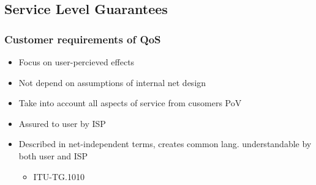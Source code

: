 \documentclass[a4paper]{article}
\begin{document}
\subsection{Service Level Guarantees}
\subsubsection{Customer requirements of QoS}
\begin{itemize}
	\item Focus on user-percieved effects
	\item Not depend on assumptions of internal net design
	\item Take into account all aspects of service from cusomers PoV
	\item Assured to user by ISP
	\item Described in net-independent terms, creates common lang.
		understandable by both user and ISP
	\begin{itemize}
		\item ITU-TG.1010
	\end{itemize}
\end{itemize}
\end{document}
